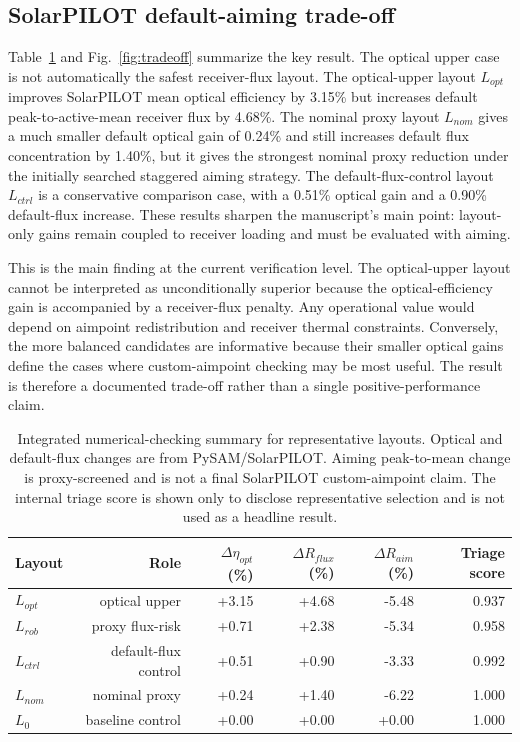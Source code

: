 \documentclass[final,3p,times]{elsarticle}
\begin{document}
\subsection{SolarPILOT default-aiming trade-off}
Table~\ref{tab:summary} and Fig.~\ref{fig:tradeoff} summarize the key result. The optical upper case is not automatically the safest receiver-flux layout. The optical-upper layout $L_{opt}$ improves SolarPILOT mean optical efficiency by 3.15\% but increases default peak-to-active-mean receiver flux by 4.68\%. The nominal proxy layout $L_{nom}$ gives a much smaller default optical gain of 0.24\% and still increases default flux concentration by 1.40\%, but it gives the strongest nominal proxy reduction under the initially searched staggered aiming strategy. The default-flux-control layout $L_{ctrl}$ is a conservative comparison case, with a 0.51\% optical gain and a 0.90\% default-flux increase. These results sharpen the manuscript's main point: layout-only gains remain coupled to receiver loading and must be evaluated with aiming.

This is the main finding at the current verification level. The optical-upper layout cannot be interpreted as unconditionally superior because the optical-efficiency gain is accompanied by a receiver-flux penalty. Any operational value would depend on aimpoint redistribution and receiver thermal constraints. Conversely, the more balanced candidates are informative because their smaller optical gains define the cases where custom-aimpoint checking may be most useful. The result is therefore a documented trade-off rather than a single positive-performance claim.

\begin{table}[t]
\centering
\caption{Integrated numerical-checking summary for representative layouts. Optical and default-flux changes are from PySAM/SolarPILOT. Aiming peak-to-mean change is proxy-screened and is not a final SolarPILOT custom-aimpoint claim. The internal triage score is shown only to disclose representative selection and is not used as a headline result.}
\label{tab:summary}
\scriptsize
\begin{tabular}{lrrrrr}
\toprule
Layout & Role & $\Delta\eta_{opt}$ (\%) & $\Delta R_{flux}$ (\%) & $\Delta R_{aim}$ (\%) & Triage score \\
\midrule
$L_{opt}$ & optical upper & +3.15 & +4.68 & -5.48 & 0.937 \\
$L_{rob}$ & proxy flux-risk & +0.71 & +2.38 & -5.34 & 0.958 \\
$L_{ctrl}$ & default-flux control & +0.51 & +0.90 & -3.33 & 0.992 \\
$L_{nom}$ & nominal proxy & +0.24 & +1.40 & -6.22 & 1.000 \\
$L_0$ & baseline control & +0.00 & +0.00 & +0.00 & 1.000 \\
\bottomrule
\end{tabular}
\end{table}
\end{document}
